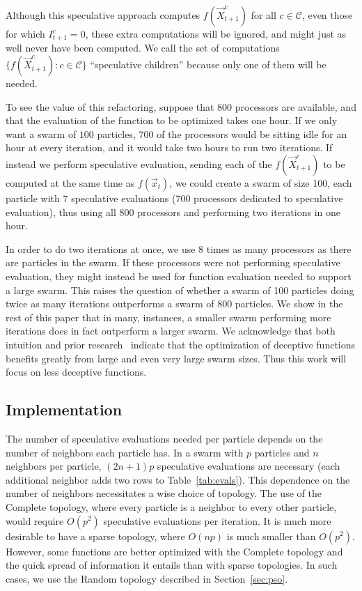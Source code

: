 \documentclass{llncs}
\renewcommand{\sec}[1]{Section~\ref{sec:#1}}
\providecommand{\ppos}{\ensuremath{\Vec{x}}}
\providecommand{\ofunc}{\ensuremath{f}}
\providecommand{\indic}{\ensuremath{I}}
\providecommand{\specpos}{\ensuremath{\vec{X}}}
\providecommand{\caseset}{\ensuremath{\mathcal{C}}}
\providecommand{\casegen}{\ensuremath{c}}
\begin{document}
Although this speculative approach computes
$\ofunc(\specpos_{t+1}^{\casegen})$ for all $\casegen \in \caseset$, even those
for which $\indic_{t+1}^{\casegen} = 0$, these extra computations will be
ignored, and might just as well never have been computed.  We call the set of
computations $\{\ofunc(\specpos_{t+1}^{c}) : \casegen \in \caseset\}$
``speculative children'' because only one of them will be needed.

To see the value of this refactoring, suppose that $800$ processors are
available, and that the evaluation of the function to be optimized takes one
hour.  If we only want a swarm of $100$ particles, $700$ of the processors
would be sitting idle for an hour at every iteration, and it would take two
hours to run two iterations.  If instead we perform speculative evaluation,
sending each of the $\ofunc(\specpos_{t+1}^{c})$ to be computed at the same
time as $\ofunc(\ppos_{t})$, we could create a swarm of size 100, each particle
with $7$ speculative evaluations ($700$ processors dedicated to speculative
evaluation), thus using all $800$ processors and performing two iterations in
one hour.

In order to do two iterations at once, we use 8 times as many processors as
there are particles in the swarm.  If these processors were not performing
speculative evaluation, they might instead be used for function evaluation
needed to support a large swarm.  This raises the question of whether a swarm
of 100 particles doing twice as many iterations outperforms a swarm of 800
particles.  We show in the rest of this paper that in many, instances, a
smaller swarm performing more iterations does in fact outperform a larger
swarm.  We acknowledge that both intuition and prior
research~\cite{mcnabb-2009-large-particle-swarms} indicate that the
optimization of deceptive functions benefits greatly from large and even very
large swarm sizes. Thus this work will focus on less deceptive functions.

\subsection{Implementation}
\label{sec:implementation}

The number of speculative evaluations needed per particle depends on the number
of neighbors each particle has.  In a swarm with $p$ particles and $n$
neighbors per particle, $(2n+1)p$ speculative evaluations are necessary (each
additional neighbor adds two rows to Table~\ref{tab:evals}).  This dependence
on the number of neighbors necessitates a wise choice of topology.  The use of
the Complete topology, where every particle is a neighbor to every other
particle, would require $O(p^2)$ speculative evaluations per iteration.  It is
much more desirable to have a sparse topology, where $O(np)$ is much smaller
than $O(p^2)$.  However, some functions are better optimized with the Complete
topology and the quick spread of information it entails than with sparse
topologies.  In such cases, we use the Random topology described in \sec{pso}.
\end{document}
